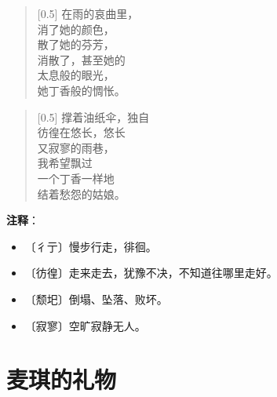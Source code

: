 \documentclass[12pt,UTF-8,openany]{ctexbook}
\begin{document}
\begin{large}
    
    \begin{verse}[0.5\linewidth]
        在雨的哀曲里， \\
        消了她的颜色， \\
        散了她的芬芳， \\
        消散了，甚至她的 \\
        太息般的眼光， \\
        她丁香般的惆怅。
    \end{verse}
    
    
    \begin{verse}[0.5\linewidth]
        撑着油纸伞，独自 \\
        彷徨在悠长，悠长 \\
        又寂寥的雨巷， \\
        我希望飘过 \\
        一个丁香一样地 \\
        结着愁怨的姑娘。
    \end{verse}
    
\end{large}


\newpage

\textbf{注释}：

\vspace{-1em}

\begin{itemize}
    \setlength\itemsep{-0.2em}
    \item 〔彳亍〕慢步行走，徘徊。
    \item 〔彷徨〕走来走去，犹豫不决，不知道往哪里走好。
    \item 〔颓圯〕倒塌、坠落、败坏。
    \item 〔寂寥〕空旷寂静无人。
\end{itemize}

\chapter{麦琪的礼物}
\end{document}
